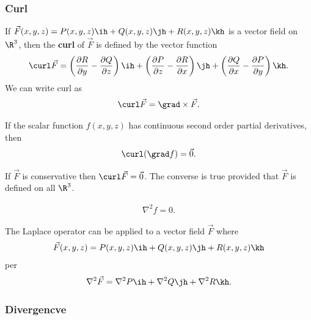 \documentclass{article}
\begin{document}
\subsubsection{Curl}
\begin{definition}
	If $\vec F(x,y,z) = P(x,y,z)\ih + Q(x,y,z)\jh + R(x,y,z)\kh$ is a vector field
	on $\R^3$, then the \textbf{curl} of $\vec F$ is defined by the vector function
	\begin{align*}
		\curl\vec F = \left(\frac{\partial R}{\partial y}-\frac{\partial Q}{\partial z}\right)\ih
		+\left(\frac{\partial P}{\partial z}-\frac{\partial R}{\partial x}\right)\jh
		+\left(\frac{\partial Q}{\partial x}-\frac{\partial P}{\partial y}\right)\kh.
	\end{align*}
	We can write curl as
	\begin{align*}
		\curl\vec F = \grad \times \vec F.
	\end{align*}
\end{definition}
\begin{theorem}
	If the scalar function $f(x,y,z)$ has continuous second order partial derivatives,
	then
	\begin{align*}
		\curl(\grad f) = \vec 0.
	\end{align*}
\end{theorem}
\begin{corollary}
	If $\vec F$ is conservative then $\curl\vec F = \vec 0$. The converse is true
	provided that $\vec F$ is defined on all $\R^3$.
\end{corollary}
\begin{theorem}
	\begin{align*}
		\nabla^2 f = 0.
	\end{align*}
\end{theorem}
\begin{definition}
	The Laplace operator can be applied to a vector field $\vec F$ where
	\begin{align*}
		\vec F(x,y,z) =P(x,y,z)\ih + Q(x,y,z)\jh + R(x,y,z)\kh
	\end{align*}
	per
	\begin{align*}
		\nabla^2 \vec F = \nabla^2 P\ih + \nabla^2 Q\jh + \nabla^2 R\kh.
	\end{align*}
\end{definition}

\subsubsection{Divergencve}
\end{document}
